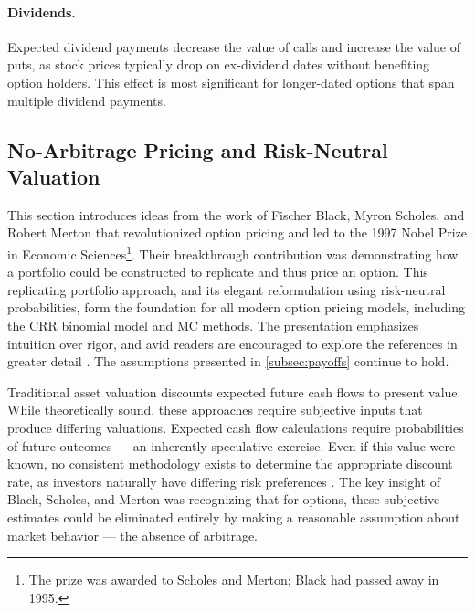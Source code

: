 \documentclass[english,12pt,a4paper,pdftex,sci,utf8]{aaltothesis}
\begin{document}
\paragraph{Dividends.} Expected dividend payments decrease the value of calls and increase the value of puts, as stock prices typically drop on ex-dividend dates without benefiting option holders. This effect is most significant for longer-dated options that span multiple dividend payments.
\clearpage


\subsection{No-Arbitrage Pricing and Risk-Neutral Valuation}\label{sec:risk-neutral-theory}

This section introduces ideas from the work of Fischer Black, Myron Scholes, and Robert Merton that revolutionized option pricing and led to the 1997 Nobel Prize in Economic Sciences\footnote{The prize was awarded to Scholes and Merton; Black had passed away in 1995.}. Their breakthrough contribution was demonstrating how a portfolio could be constructed to replicate and thus price an option. This replicating portfolio approach, and its elegant reformulation using risk-neutral probabilities, form the foundation for all modern option pricing models, including the CRR binomial model and MC methods. The presentation emphasizes intuition over rigor, and avid readers are encouraged to explore the references in greater detail \cite{hull2018, gisiger2010risk, tham2001risk}. The assumptions presented in \cref{subsec:payoffs} continue to hold.

Traditional asset valuation discounts expected future cash flows to present value. While theoretically sound, these approaches require subjective inputs that produce differing valuations. Expected cash flow calculations require probabilities of future outcomes --- an inherently speculative exercise. Even if this value were known, no consistent methodology exists to determine the appropriate discount rate, as investors naturally have differing risk preferences \cite{nobel1997}. The key insight of Black, Scholes, and Merton was recognizing that for options, these subjective estimates could be eliminated entirely by making a reasonable assumption about market behavior --- the absence of arbitrage.
\end{document}
